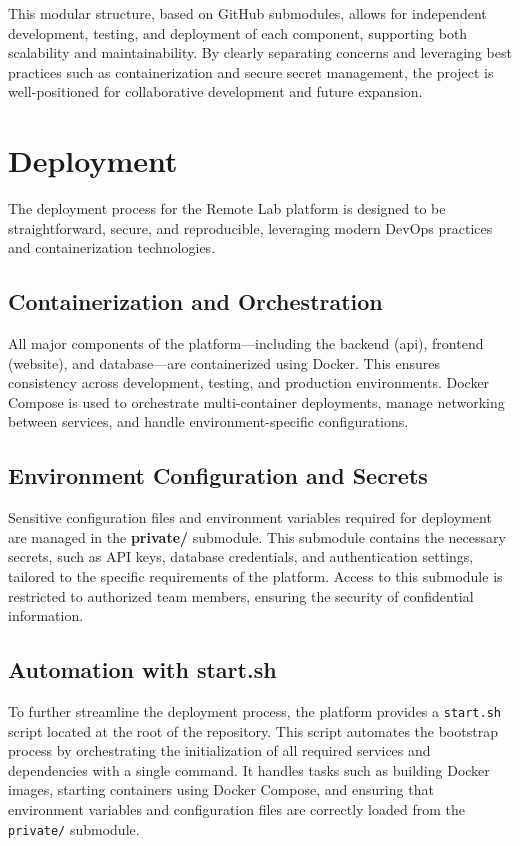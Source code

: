 This modular structure, based on GitHub submodules, allows for independent development, testing, and deployment of each component, supporting both scalability and maintainability. By clearly separating concerns and leveraging best practices such as containerization and secure secret management, the project is well-positioned for collaborative development and future expansion.

\section{Deployment} \label{sec:deployment}

The deployment process for the Remote Lab platform is designed to be straightforward, secure, and reproducible, leveraging modern DevOps practices and containerization technologies.

\subsection{Containerization and Orchestration} \label{subsec:containerization}
All major components of the platform—including the backend (api), frontend (website), and database—are containerized using Docker. This ensures consistency across development, testing, and production environments. Docker Compose is used to orchestrate multi-container deployments, manage networking between services, and handle environment-specific configurations.

\subsection{Environment Configuration and Secrets} \label{subsec:env_config}
Sensitive configuration files and environment variables required for deployment are managed in the \textbf{private/} submodule. This submodule contains the necessary secrets, such as API keys, database credentials, and authentication settings, tailored to the specific requirements of the platform. Access to this submodule is restricted to authorized team members, ensuring the security of confidential information.

\subsection{Automation with start.sh} \label{subsec:automation_startsh}
To further streamline the deployment process, the platform provides a \texttt{start.sh} script located at the root of the repository. This script automates the bootstrap process by orchestrating the initialization of all required services and dependencies with a single command. It handles tasks such as building Docker images, starting containers using Docker Compose, and ensuring that environment variables and configuration files are correctly loaded from the \texttt{private/} submodule.

